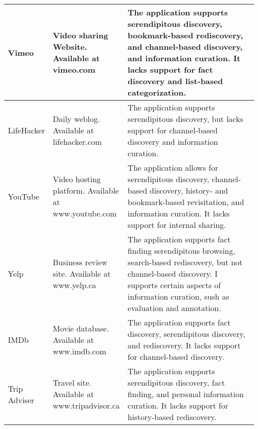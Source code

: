 \documentclass{casconpaper}
\begin{document}
{\begin{table*}[htbp]
\begin{tabular}{|p{0.11\linewidth}| p{0.22\linewidth}| p{0.67\linewidth}|}
\hline
Vimeo           & \raggedright Video sharing Website. Available at vimeo.com                                & The application supports serendipitous discovery, bookmark-based rediscovery, and channel-based discovery, and information curation. It lacks support for fact discovery and list-based categorization. \\
\hline
LifeHacker      & \raggedright Daily weblog. Available at lifehacker.com                                    & The application supports serendipitous discovery, but lacks support for channel-based discovery and information curation.                                                                                                                                                                                                 \\
\hline
YouTube         & \raggedright Video hosting platform. Available at www.youtube.com                         & The application allows for serendipitous discovery, channel-based discovery, history- and bookmark-based revisitation, and information curation. It lacks support for internal sharing.                                                                                                                                                \\
\hline
Yelp            & \raggedright Business review site. Available at www.yelp.ca                               & The application supports fact finding serendipitous browsing, search-based rediscovery, but not channel-based discovery. I supports certain aspects of information curation, sush as evaluation and annotation.                                                                                                 \\
\hline
IMDb            & \raggedright Movie database. Available at www.imdb.com                                    & The application supports fact discovery, serendipitous discovery, and rediscovery. It lacks support for channel-based discovery.                                                                                                                                                          \\
\hline
Trip Adviser    & \raggedright Travel site. Available at www.tripadvisor.ca                                 & The application supports serendipitous discovery, fact finding, and personal information curation. It lacks support for history-based rediscovery.                                                                                                                                 \\

\end{tabular}
\end{table*}}
\end{document}
